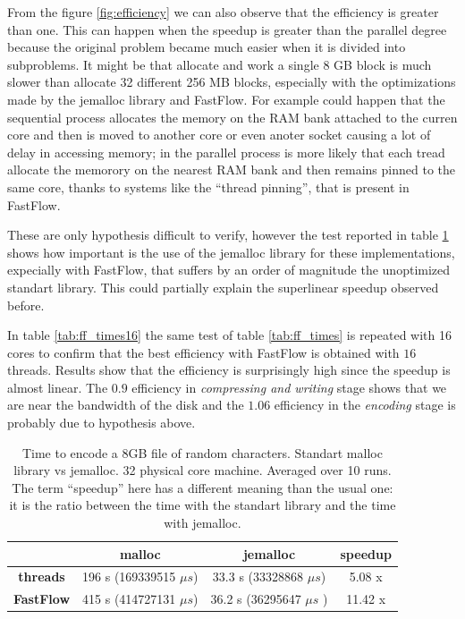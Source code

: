 \documentclass[12pt, letterpaper]{article}
\begin{document}
From the figure \ref{fig:efficiency} we can also observe that the efficiency is greater than one. This can happen when the speedup is greater than the parallel degree because the original problem became much easier when it is divided into subproblems. It might be that allocate and work a single 8 GB block is much slower than allocate 32 different 256 MB blocks, especially with the optimizations made by the jemalloc library and FastFlow. For example could happen that the sequential process allocates the memory on the RAM bank attached to the curren core and then is moved to another core or even anoter socket causing a lot of delay in accessing memory; in the parallel process is more likely that each tread allocate the memorory on the nearest RAM bank and then remains pinned to the same core, thanks to systems like the ``thread pinning'', that is present in FastFlow.

These are only hypothesis difficult to verify, however the test reported in table \ref{tab:jemalloc} shows how important is the use of the jemalloc library for these implementations, expecially with FastFlow, that suffers by an order of magnitude the unoptimized standart library. This could partially explain the superlinear speedup observed before.

In table \ref{tab:ff_times16} the same test of table \ref{tab:ff_times} is repeated with 16 cores to confirm that the best efficiency with FastFlow is obtained with $16$ threads. Results show that the efficiency is surprisingly high since the speedup is almost linear. The $0.9 $ efficiency in \textit{compressing and writing} stage shows that we are near the bandwidth of the disk and the $1.06$ efficiency in the \textit{encoding} stage is probably due to hypothesis above.

\begin{table}[!h]
    \begin{center}
    \begin{tabular}{c c c c}
        & \textbf{malloc} & \textbf{jemalloc} & speedup\\
        \hline
        \textbf{threads} & 196 s (169339515 $\mu s$)  & 33.3 s  (33328868 $\mu s$) & 5.08 x \\
        \hline
        \textbf{FastFlow} &  415 s  (414727131 $\mu s$) & 36.2 s (36295647 $\mu s$ ) & 11.42 x \\
        \hline
    \end{tabular}
\caption{Time to encode a 8GB file of random characters. Standart malloc library vs jemalloc. 32 physical core machine. Averaged over 10 runs. The term ``speedup'' here has a different meaning than the usual one: it is the ratio between the time with the standart library and the time with jemalloc.}    
\label{tab:jemalloc}
\end{center}
\end{table}
\end{document}
